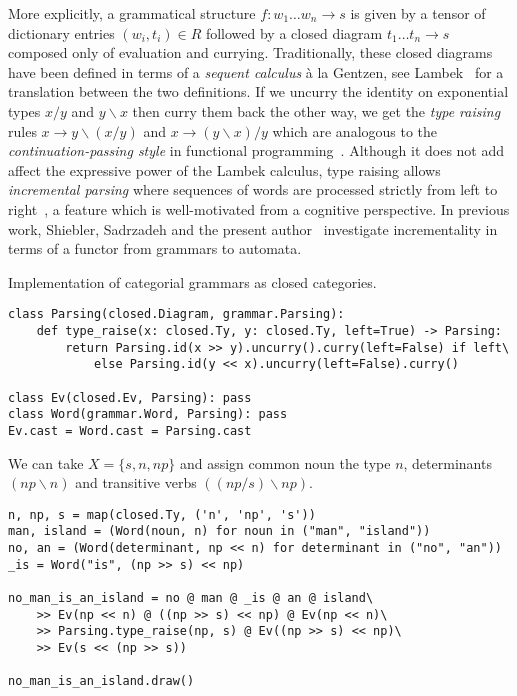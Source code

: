 More explicitly, a grammatical structure $f : w_1 \dots w_n \to s$ is given by a tensor of dictionary entries $(w_i, t_i) \in R$ followed by a closed diagram $t_1 \dots t_n \to s$ composed only of evaluation and currying.
Traditionally, these closed diagrams have been defined in terms of a \emph{sequent calculus} à la Gentzen, see Lambek~\cite{Lambek88} for a translation between the two definitions.
If we uncurry the identity on exponential types $x / y$ and $y \backslash x$ then curry them back the other way, we get the \emph{type raising} rules $x \to y \backslash (x / y)$ and $x \to (y \backslash x) / y$ which are analogous to the \emph{continuation-passing style} in functional programming~\cite{DeGroote01}.
Although it does not add affect the expressive power of the Lambek calculus, type raising allows \emph{incremental parsing} where sequences of words are processed strictly from left to right~\cite{Dowty88,Steedman91}, a feature which is well-motivated from a cognitive perspective.
In previous work, Shiebler, Sadrzadeh and the present author~\cite{ShieblerEtAl20} investigate incrementality in terms of a functor from grammars to automata.

\begin{python}
{\normalfont Implementation of categorial grammars as closed categories.}

\begin{verbatim}
class Parsing(closed.Diagram, grammar.Parsing):
    def type_raise(x: closed.Ty, y: closed.Ty, left=True) -> Parsing:
        return Parsing.id(x >> y).uncurry().curry(left=False) if left\
            else Parsing.id(y << x).uncurry(left=False).curry()

class Ev(closed.Ev, Parsing): pass
class Word(grammar.Word, Parsing): pass
Ev.cast = Word.cast = Parsing.cast
\end{verbatim}
\end{python}

\begin{example}
We can take $X = \{ s, n, np \}$ and assign common noun the type $n$, determinants $(np \backslash n)$ and transitive verbs $((np / s) \backslash np)$.

\begin{verbatim}
n, np, s = map(closed.Ty, ('n', 'np', 's'))
man, island = (Word(noun, n) for noun in ("man", "island"))
no, an = (Word(determinant, np << n) for determinant in ("no", "an"))
_is = Word("is", (np >> s) << np)

no_man_is_an_island = no @ man @ _is @ an @ island\
    >> Ev(np << n) @ ((np >> s) << np) @ Ev(np << n)\
    >> Parsing.type_raise(np, s) @ Ev((np >> s) << np)\
    >> Ev(s << (np >> s))

no_man_is_an_island.draw()
\end{verbatim}
\end{example}

